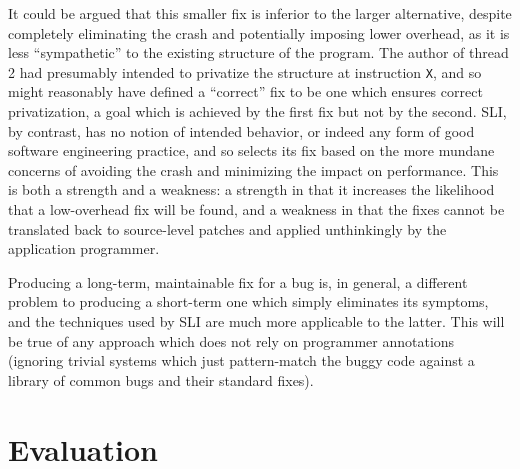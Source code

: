 \documentclass[10pt,letter,twocolumn]{sigplanconf}
\newcommand{\editorial}[1]{}
\begin{document}
It could be argued that this smaller fix is inferior to the larger
alternative, despite completely eliminating the crash and potentially
imposing lower overhead, as it is less ``sympathetic'' to the existing
structure of the program.  The author of thread 2 had presumably
intended to privatize the structure at instruction \verb|X|, and so
might reasonably have defined a ``correct'' fix to be one which
ensures correct privatization, a goal which is achieved by the first
fix but not by the second.  SLI, by contrast, has no notion of
intended behavior, or indeed any form of good software engineering
practice, and so selects its fix based on the more mundane concerns of
avoiding the crash and minimizing the impact on performance.  This is
both a strength and a weakness: a strength in that it increases the
likelihood that a low-overhead fix will be found, and a weakness in
that the fixes cannot be translated back to source-level patches and
applied unthinkingly by the application programmer.

Producing a long-term, maintainable fix for a bug is, in general, a
different problem to producing a short-term one which simply
eliminates its symptoms, and the techniques used by SLI are much more
applicable to the latter.  This will be true of any approach which
does not rely on programmer annotations (ignoring trivial systems
which just pattern-match the buggy code against a library of common
bugs and their standard fixes).\editorial{This could do with being a
  bit earlier.}

\section{Evaluation}
\label{sect:evaluation}
\end{document}

